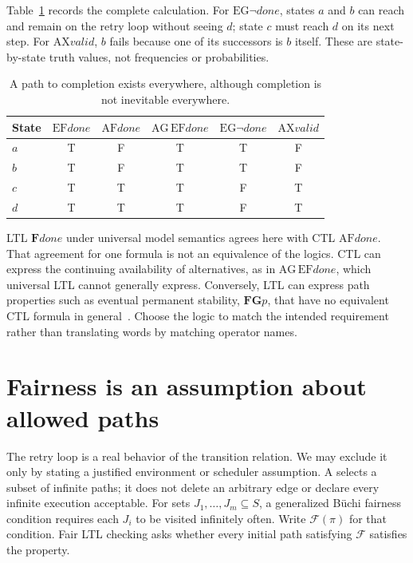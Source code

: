 Table~\ref{tab:ch45-ctl-truth} records the complete calculation.
For $\mathrm{EG}\neg\mathit{done}$, states $a$ and $b$ can reach and remain on the retry loop without seeing $d$; state $c$ must reach $d$ on its next step.
For $\mathrm{AX}\mathit{valid}$, $b$ fails because one of its successors is $b$ itself.
These are state-by-state truth values, not frequencies or probabilities.

\begin{table}[tbp]
\centering
\caption{A path to completion exists everywhere, although completion is not inevitable everywhere.}
\label{tab:ch45-ctl-truth}
\begin{tabular}{lccccc}
\toprule
State & $\mathrm{EF}\mathit{done}$ & $\mathrm{AF}\mathit{done}$ & $\mathrm{AG}\,\mathrm{EF}\mathit{done}$ & $\mathrm{EG}\neg\mathit{done}$ & $\mathrm{AX}\mathit{valid}$ \\
\midrule
$a$ & T & F & T & T & F \\
$b$ & T & F & T & T & F \\
$c$ & T & T & T & F & T \\
$d$ & T & T & T & F & T \\
\bottomrule
\end{tabular}
\end{table}

LTL $\mathbf{F}\mathit{done}$ under universal model semantics agrees here with CTL $\mathrm{AF}\mathit{done}$.
That agreement for one formula is not an equivalence of the logics.
CTL can express the continuing availability of alternatives, as in $\mathrm{AG}\,\mathrm{EF}\mathit{done}$, which universal LTL cannot generally express.
Conversely, LTL can express path properties such as eventual permanent stability, $\mathbf{F}\mathbf{G}p$, that have no equivalent CTL formula in general~\cite{huth-2004-logic}.
Choose the logic to match the intended requirement rather than translating words by matching operator names.

\section{Fairness is an assumption about allowed paths}
\label{sec:ch45-fairness}

The retry loop is a real behavior of the transition relation.
We may exclude it only by stating a justified environment or scheduler assumption.
A  selects a subset of infinite paths; it does not delete an arbitrary edge or declare every infinite execution acceptable.
For sets $J_1,\ldots,J_m\subseteq S$, a generalized B\"uchi fairness condition requires each $J_i$ to be visited infinitely often.
Write $\mathcal{F}(\pi)$ for that condition.
Fair LTL checking asks whether every initial path satisfying $\mathcal{F}$ satisfies the property.

